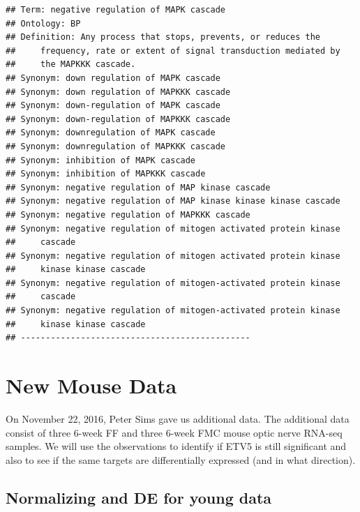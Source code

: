 \documentclass{article}\usepackage[]{graphicx}\usepackage[]{color}
\makeatletter
\newenvironment{kframe}{%
 \def\at@end@of@kframe{}%
 \ifinner\ifhmode%
  \def\at@end@of@kframe{\end{minipage}}%
  \begin{minipage}{\columnwidth}%
 \fi\fi%
 \def\FrameCommand##1{\hskip\@totalleftmargin \hskip-\fboxsep
 \colorbox{shadecolor}{##1}\hskip-\fboxsep
     \hskip-\linewidth \hskip-\@totalleftmargin \hskip\columnwidth}%
 \MakeFramed {\advance\hsize-\width
   \@totalleftmargin\z@ \linewidth\hsize
   \@setminipage}}%
 {\par\unskip\endMakeFramed%
 \at@end@of@kframe}
\newenvironment{knitrout}{}{} %
\makeatother
\begin{document}
\begin{knitrout}
\begin{kframe}
\begin{verbatim}
## Term: negative regulation of MAPK cascade
## Ontology: BP
## Definition: Any process that stops, prevents, or reduces the
##     frequency, rate or extent of signal transduction mediated by
##     the MAPKKK cascade.
## Synonym: down regulation of MAPK cascade
## Synonym: down regulation of MAPKKK cascade
## Synonym: down-regulation of MAPK cascade
## Synonym: down-regulation of MAPKKK cascade
## Synonym: downregulation of MAPK cascade
## Synonym: downregulation of MAPKKK cascade
## Synonym: inhibition of MAPK cascade
## Synonym: inhibition of MAPKKK cascade
## Synonym: negative regulation of MAP kinase cascade
## Synonym: negative regulation of MAP kinase kinase kinase cascade
## Synonym: negative regulation of MAPKKK cascade
## Synonym: negative regulation of mitogen activated protein kinase
##     cascade
## Synonym: negative regulation of mitogen activated protein kinase
##     kinase kinase cascade
## Synonym: negative regulation of mitogen-activated protein kinase
##     cascade
## Synonym: negative regulation of mitogen-activated protein kinase
##     kinase kinase cascade
## ----------------------------------------------
\end{verbatim}
\end{kframe}
\end{knitrout}




\newpage
\section{New Mouse Data}

On November 22, 2016, Peter Sims gave us additional data.  The additional data consist of three 6-week FF and three 6-week FMC mouse optic nerve RNA-seq samples.  We will use the observations to identify if ETV5 is still significant and also to see if the same targets are differentially expressed (and in what direction).

\subsection{Normalizing and DE for young data}
\end{document}
